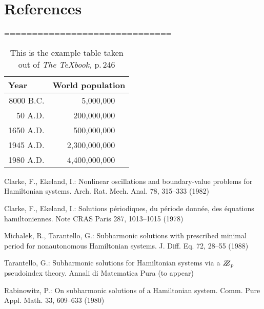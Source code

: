 \documentclass{llncs}
\begin{document}
\newpage

\section{References}

==============================

\begin{table}
\caption{This is the example table taken out of {\it The
\TeX{}book,} p.\,246}
\begin{center}
\begin{tabular}{r@{\quad}rl}
\hline
\multicolumn{1}{l}{\rule{0pt}{12pt}
                   Year}&\multicolumn{2}{l}{World 
population}\\[2pt]
\hline\rule{0pt}{12pt}
8000 B.C.  &     5,000,000& \\
  50 A.D.  &   200,000,000& \\
1650 A.D.  &   500,000,000& \\
1945 A.D.  & 2,300,000,000& \\
1980 A.D.  & 4,400,000,000& \\[2pt]
\hline
\end{tabular}
\end{center}
\end{table}
%

%
%
\begin{thebibliography}{5}
%
Clarke, F., Ekeland, I.:
Nonlinear oscillations and
boundary-value problems for Hamiltonian systems.
Arch. Rat. Mech. Anal. 78, 315--333 (1982)

Clarke, F., Ekeland, I.:
Solutions p\'{e}riodiques, du
p\'{e}riode donn\'{e}e, des \'{e}quations hamiltoniennes.
Note CRAS Paris 287, 1013--1015 (1978)

Michalek, R., Tarantello, G.:
Subharmonic solutions with prescribed minimal
period for nonautonomous Hamiltonian systems.
J. Diff. Eq. 72, 28--55 (1988)

Tarantello, G.:
Subharmonic solutions for Hamiltonian
systems via a $\bbbz_{p}$ pseudoindex theory.
Annali di Matematica Pura (to appear)

Rabinowitz, P.:
On subharmonic solutions of a Hamiltonian system.
Comm. Pure Appl. Math. 33, 609--633 (1980)

\end{thebibliography}
\end{document}
